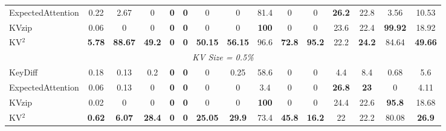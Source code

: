 \documentclass[11pt]{article}
\begin{document}
\begin{table}[htbp]
\begin{tabular}{l|cc|cccccccc|cc|c|c}
ExpectedAttention
    & 0.22 & 2.67
    & 0 & \textbf{0} & \textbf{0}
    & 0 & 0
    & 81.4 & 0 & 0
    & \textbf{26.2} & 22.8
    & 3.56
    & 10.53 \\

KVzip
    & 0.06 & 0
    & 0 & \textbf{0} & \textbf{0}
    & 0 & 0
    & \textbf{100} & 0 & 0
    & 23.6 & 22.4
    & \textbf{99.92}
    & 18.92 \\

KV$^2$
    & \textbf{5.78} & \textbf{88.67}
    & \textbf{49.2} & \textbf{0} & \textbf{0}
    & \textbf{50.15} & \textbf{56.15}
    & 96.6 & \textbf{72.8} & \textbf{95.2}
    & 22.2 & \textbf{24.2}
    & 84.64
    & \textbf{49.66} \\

\midrule
\multicolumn{15}{c}{\textit{KV Size = 0.5\%}} \\
\midrule

KeyDiff
    & 0.18 & 0.13
    & 0.2 & \textbf{0} & \textbf{0}
    & 0 & 0.25
    & 58.6 & 0 & 0
    & 4.4 & 8.4
    & 0.68
    & 5.6 \\

ExpectedAttention
    & 0.06 & 0.13
    & 0 & \textbf{0} & \textbf{0}
    & 0 & 0
    & 3.4 & 0 & 0
    & \textbf{26.8} & \textbf{23}
    & 0
    & 4.11 \\

KVzip
    & 0.02 & 0
    & 0 & \textbf{0} & \textbf{0}
    & 0 & 0
    & \textbf{100} & 0 & 0
    & 24.4 & 22.6
    & \textbf{95.8}
    & 18.68 \\

KV$^2$
    & \textbf{0.62} & \textbf{6.07}
    & \textbf{28.4} & \textbf{0} & \textbf{0}
    & \textbf{25.05} & \textbf{29.9}
    & 73.4 & \textbf{45.8} & \textbf{16.2}
    & 22 & 22.2
    & 80.08
    & \textbf{26.9} \\

\bottomrule
\end{tabular}

\end{table}
\end{document}
